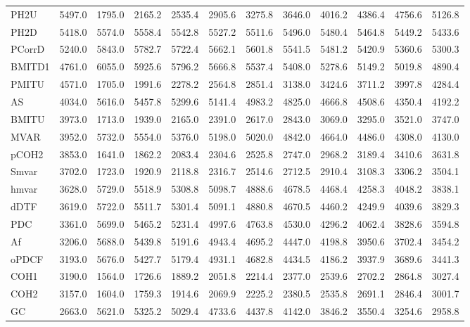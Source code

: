 \begin{table}[ht]
\begin{tabular}{lrrrrrrrrrrr}
  PH2U & 5497.0 & 1795.0 & 2165.2 & 2535.4 & 2905.6 & 3275.8 & 3646.0 & 4016.2 & 4386.4 & 4756.6 & 5126.8 \\ 
  PH2D & 5418.0 & 5574.0 & 5558.4 & 5542.8 & 5527.2 & 5511.6 & 5496.0 & 5480.4 & 5464.8 & 5449.2 & 5433.6 \\ 
  PCorrD & 5240.0 & 5843.0 & 5782.7 & 5722.4 & 5662.1 & 5601.8 & 5541.5 & 5481.2 & 5420.9 & 5360.6 & 5300.3 \\ 
  BMITD1 & 4761.0 & 6055.0 & 5925.6 & 5796.2 & 5666.8 & 5537.4 & 5408.0 & 5278.6 & 5149.2 & 5019.8 & 4890.4 \\ 
  PMITU & 4571.0 & 1705.0 & 1991.6 & 2278.2 & 2564.8 & 2851.4 & 3138.0 & 3424.6 & 3711.2 & 3997.8 & 4284.4 \\ 
  AS & 4034.0 & 5616.0 & 5457.8 & 5299.6 & 5141.4 & 4983.2 & 4825.0 & 4666.8 & 4508.6 & 4350.4 & 4192.2 \\ 
  BMITU & 3973.0 & 1713.0 & 1939.0 & 2165.0 & 2391.0 & 2617.0 & 2843.0 & 3069.0 & 3295.0 & 3521.0 & 3747.0 \\ 
  MVAR & 3952.0 & 5732.0 & 5554.0 & 5376.0 & 5198.0 & 5020.0 & 4842.0 & 4664.0 & 4486.0 & 4308.0 & 4130.0 \\ 
  pCOH2 & 3853.0 & 1641.0 & 1862.2 & 2083.4 & 2304.6 & 2525.8 & 2747.0 & 2968.2 & 3189.4 & 3410.6 & 3631.8 \\ 
  Smvar & 3702.0 & 1723.0 & 1920.9 & 2118.8 & 2316.7 & 2514.6 & 2712.5 & 2910.4 & 3108.3 & 3306.2 & 3504.1 \\ 
  hmvar & 3628.0 & 5729.0 & 5518.9 & 5308.8 & 5098.7 & 4888.6 & 4678.5 & 4468.4 & 4258.3 & 4048.2 & 3838.1 \\ 
  dDTF & 3619.0 & 5722.0 & 5511.7 & 5301.4 & 5091.1 & 4880.8 & 4670.5 & 4460.2 & 4249.9 & 4039.6 & 3829.3 \\ 
  PDC & 3361.0 & 5699.0 & 5465.2 & 5231.4 & 4997.6 & 4763.8 & 4530.0 & 4296.2 & 4062.4 & 3828.6 & 3594.8 \\ 
  Af & 3206.0 & 5688.0 & 5439.8 & 5191.6 & 4943.4 & 4695.2 & 4447.0 & 4198.8 & 3950.6 & 3702.4 & 3454.2 \\ 
  oPDCF & 3193.0 & 5676.0 & 5427.7 & 5179.4 & 4931.1 & 4682.8 & 4434.5 & 4186.2 & 3937.9 & 3689.6 & 3441.3 \\ 
  COH1 & 3190.0 & 1564.0 & 1726.6 & 1889.2 & 2051.8 & 2214.4 & 2377.0 & 2539.6 & 2702.2 & 2864.8 & 3027.4 \\ 
  COH2 & 3157.0 & 1604.0 & 1759.3 & 1914.6 & 2069.9 & 2225.2 & 2380.5 & 2535.8 & 2691.1 & 2846.4 & 3001.7 \\ 
  GC & 2663.0 & 5621.0 & 5325.2 & 5029.4 & 4733.6 & 4437.8 & 4142.0 & 3846.2 & 3550.4 & 3254.6 & 2958.8 \\ 

\end{tabular}
\end{table}
